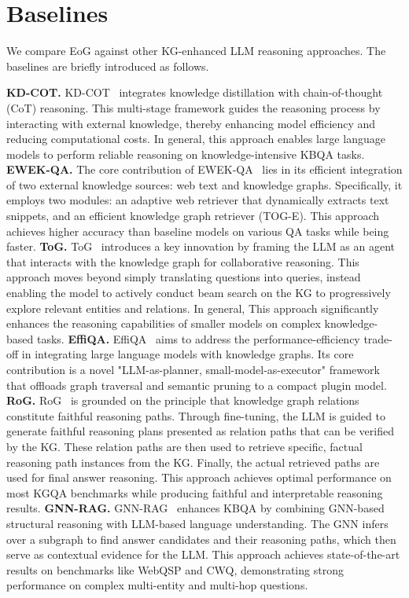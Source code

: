 \section{Baselines}
\label{app:baselines}
We compare EoG against other KG-enhanced LLM reasoning approaches.
The baselines are briefly introduced as follows.

\textbf{KD-COT.}
KD-COT~\citep{wang2023knowledge} integrates knowledge distillation with chain-of-thought (CoT) reasoning. This multi-stage framework guides the reasoning process by interacting with external knowledge, thereby enhancing model efficiency and reducing computational costs. In general, this approach enables large language models to perform reliable reasoning on knowledge-intensive KBQA tasks.
\textbf{EWEK-QA.}
The core contribution of EWEK-QA~\citep{dehghan2024ewek} lies in its efficient integration of two external knowledge sources: web text and knowledge graphs. Specifically, it employs two modules: an adaptive web retriever that dynamically extracts text snippets, and an efficient knowledge graph retriever (TOG-E). This approach achieves higher accuracy than baseline models on various QA tasks while being faster.
\textbf{ToG.}
ToG~\citep{sun2023thinkongraph} introduces a key innovation by framing the LLM as an agent that interacts with the knowledge graph for collaborative reasoning. This approach moves beyond simply translating questions into queries, instead enabling the model to actively conduct beam search on the KG to progressively explore relevant entities and relations. In general, This approach significantly enhances the reasoning capabilities of smaller models on complex knowledge-based tasks.
\textbf{EffiQA.}
EffiQA~\citep{dong2025effiqa} aims to address the performance-efficiency trade-off in integrating large language models with knowledge graphs. Its core contribution is a novel "LLM-as-planner, small-model-as-executor" framework that offloads graph traversal and semantic pruning to a compact plugin model. 
\textbf{RoG.}
RoG~\citep{luo2024rog} is grounded on the principle that knowledge graph relations constitute faithful reasoning paths. Through fine-tuning, the LLM is guided to generate faithful reasoning plans presented as relation paths that can be verified by the KG. These relation paths are then used to retrieve specific, factual reasoning path instances from the KG. Finally, the actual retrieved paths are used for final answer reasoning. This approach achieves optimal performance on most KGQA benchmarks while producing faithful and interpretable reasoning results.
\textbf{GNN-RAG.}
GNN-RAG~\citep{mavromatis2025gnn} enhances KBQA by combining GNN-based structural reasoning with LLM-based language understanding. The GNN infers over a subgraph to find answer candidates and their reasoning paths, which then serve as contextual evidence for the LLM. This approach achieves state-of-the-art results on benchmarks like WebQSP and CWQ, demonstrating strong performance on complex multi-entity and multi-hop questions.




